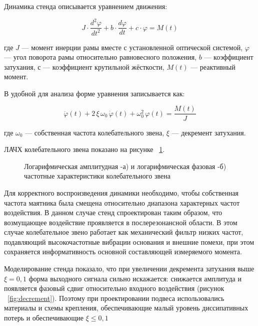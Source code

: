 Динамика стенда описывается уравнением движения:

\begin{equation}
	\label{eq:stadeq}
	J\cdot \frac{d^2\varphi}{dt^2}+b \cdot \frac{d\varphi}{dt}+ c \cdot \varphi = M(t)
\end{equation}

где \(J\) --- момент инерции рамы вместе с установленной оптической системой, \(\varphi\) --- угол поворота рамы относительно равновесного положения, \(b\) --- коэффициент затухания, \(с\) --- коэффициент крутильной жёсткости, \(M(t)\) --- реактивный момент.

В удобной для анализа форме уравнения записывается как:

\begin{equation}
	\label{eq:standeq2}
	\ddot{\varphi}(t) + 2\,\xi\,\omega_0\,\dot{\varphi}(t) + \omega_0^{2}\,\varphi(t)
	= \frac{M(t)}{J}
\end{equation}

где \(\omega_0\) --- собственная частота колебательного звена, \(\xi\) --- декремент затухания.

ЛАЧХ колебательного звена показано на рисунке ~\cref{fig:afc}.

\begin{figure}[!h] 
	\caption{Логарифмическая амплитудная -а) и логарифмическая фазовая -б) частотные характеристики колебательного звена}
	\label{fig:afc} 
\end{figure}

Для корректного воспроизведения динамики необходимо, чтобы собственная частота маятника была смещена относительно диапазона характерных частот воздействия. В данном случае стенд спроектирован таким образом, что возмущающее воздействие проявляется в послерезонансной области. В этом случае колебательное звено работает как механический фильтр низких частот, подавляющий высокочастотные вибрации основания и внешние помехи, при этом сохраняется информативность основной составляющей измеряемого момента.

Моделирование стенда показало, что при увеличении декремента затухания выше $\xi=0,1$ форма выходного сигнала сильно искажается: снижается амплитуда и появляется фазовый сдвиг относительно входного воздействия (рисунок ~\cref{fig:decrement}). Поэтому при проектировании подвеса использовались материалы и схемы крепления, обеспечивающие малый уровень диссипативных потерь и обеспечивающие $\xi \leq 0,1$

